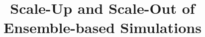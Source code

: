 \documentclass[a4paper,10pt]{article}
\newcommand{\up}{\vspace*{-1em}}
\begin{document}
\title{\LARGE %
  Scale-Up and Scale-Out of Ensemble-based Simulations}


\newif\ifdraft
\drafttrue
\ifdraft
\newcommand{\amnote}[1]{ {\textcolor{magenta} { ***AM: #1c }}}
\newcommand{\jhanote}[1]{ {\textcolor{red} { ***SJ: #1 }}}
\newcommand{\michaelnote}[1]{ {\textcolor{blue} { ***MM: #1 }}}
\newcommand{\yyenote}[1]{ {\textcolor{green} { ***YYE: #1 }}}
\else
\newcommand{\amnote}[1]{}
\newcommand{\jhanote}[1]{}
\newcommand{\michaelnote}[1]{ {\textcolor{blue} { ***MM: #1 }}}
\newcommand{\yyenote}[1]{ {}}
\fi


\date{}

\maketitle
\up\up\up\up
\end{document}
